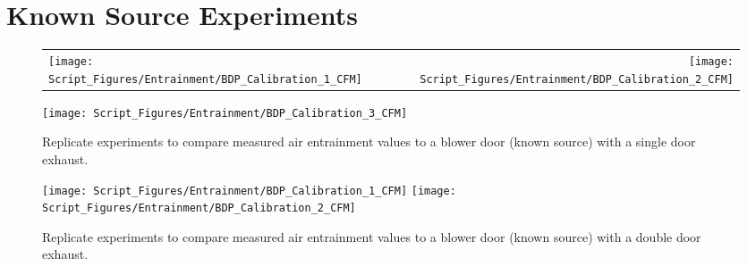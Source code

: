 \documentclass[12pt,oneside]{book}
\begin{document}
\clearpage

\chapter{Known Source Experiments}
\label{app:CFM_tests}
 
\begin{figure}[!ht]
\begin{tabular*}{\textwidth}{lr}
\texttt{[image: Script\_Figures/Entrainment/BDP\_Calibration\_1\_CFM]} &
\texttt{[image: Script\_Figures/Entrainment/BDP\_Calibration\_2\_CFM]} \\
\end{tabular*}
\centering
\texttt{[image: Script\_Figures/Entrainment/BDP\_Calibration\_3\_CFM]} 
\caption[Air Entrainment with Known Source: Blower Door Test with Single Door Exhaust]{Replicate experiments to compare measured air entrainment values to a blower door (known source) with a single door exhaust.}
\label{fig:blower_single_door}
\end{figure}

\clearpage

\begin{figure}[!ht]
\texttt{[image: Script\_Figures/Entrainment/BDP\_Calibration\_1\_CFM]} 
\texttt{[image: Script\_Figures/Entrainment/BDP\_Calibration\_2\_CFM]} 
\caption[Air Entrainment with Known Source: Blower Door Test with Double Door Exhaust]{Replicate experiments to compare measured air entrainment values to a blower door (known source) with a double door exhaust.}
\label{fig:blower_double_door}
\end{figure}
\end{document}
